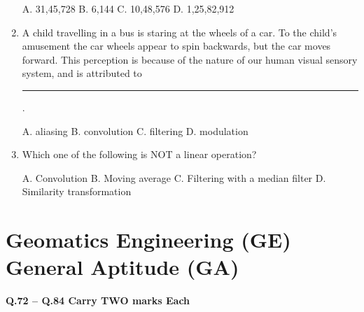 \documentclass[journal,12pt,onecolumn]{IEEEtran}
\begin{document}
\begin{enumerate}
    A. 31,45,728 \quad
    B. 6,144 \quad
    C. 10,48,576 \quad
    D. 1,25,82,912

    \item A child travelling in a bus is staring at the wheels of a car. To the child’s amusement the car wheels appear to spin backwards, but the car moves forward. This perception is because of the nature of our human visual sensory system, and is attributed to \rule{3cm}{0.15mm}.

    A. aliasing \quad
    B. convolution \quad
    C. filtering \quad
    D. modulation

    \item Which one of the following is NOT a linear operation?

    A. Convolution \quad
    B. Moving average \quad
    C. Filtering with a median filter \quad
    D. Similarity transformation
\end{enumerate}
\section*{Geomatics Engineering (GE) \\ General Aptitude (GA)}

\textbf{Q.72 -- Q.84 Carry TWO marks Each}
\end{document}
